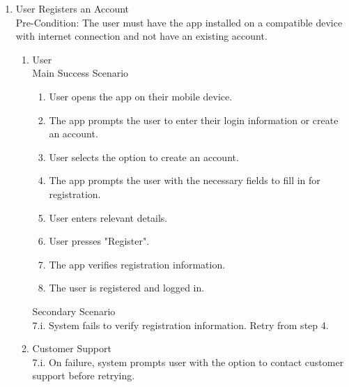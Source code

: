 \documentclass[]{article}
\begin{document}
\begin{enumerate}[{\bf BE1.}]
    \item User Registers an Account \\ 
    Pre-Condition: The user must have the app installed on a compatible device with internet connection and not have an existing account. 
    \begin{enumerate}[{\bf VP1.}]
        \item User \\
        Main Success Scenario
            \begin{enumerate}[{1.}]
                \item User opens the app on their mobile device. 
                \item The app prompts the user to enter their login information or create an account. 
                \item User selects the option to create an account. 
                \item The app prompts the user with the necessary fields to fill in for registration. 
                \item User enters relevant details.
                \item User presses "Register". 
                \item The app verifies registration information. 
                \item The user is registered and logged in. 
            \end{enumerate}
            Secondary Scenario \\
            7.i. System fails to verify registration information. Retry from step 4. \\

        \item Customer Support \\
            7.i. On failure, system prompts user with the option to contact customer support before retrying. 


\end{enumerate}
\end{enumerate}
\end{document}

